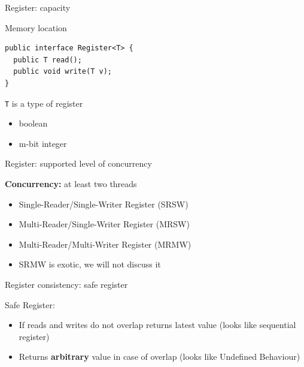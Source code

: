 \begin{frame}{Register: capacity}

Memory location

\begin{verbatim}
public interface Register<T> {
  public T read();  
  public void write(T v);
}
\end{verbatim}

\texttt{T} is a type of register
\begin{itemize}
  \item boolean
  \item m-bit integer
\end{itemize}

\end{frame}


\begin{frame}{Register: supported level of concurrency}

\textbf{Concurrency:} at least two threads

\pause

\begin{itemize}
  
  \item Single-Reader/Single-Writer Register \pause (SRSW)
  \pause

  \item Multi-Reader/Single-Writer Register \pause (MRSW)

  \pause
  \item Multi-Reader/Multi-Writer Register \pause (MRMW)

  \pause
  \item SRMW is exotic, we will not discuss it
\end{itemize}

\end{frame}


\begin{frame}[t,fragile]{Register consistency: safe register}

Safe Register:
\begin{itemize}
  \item If reads and writes do not overlap returns latest value (looks like sequential register)
  \pause
  \item Returns \textbf{arbitrary} value in case of overlap (looks like Undefined Behaviour)
\end{itemize}

\end{frame}



